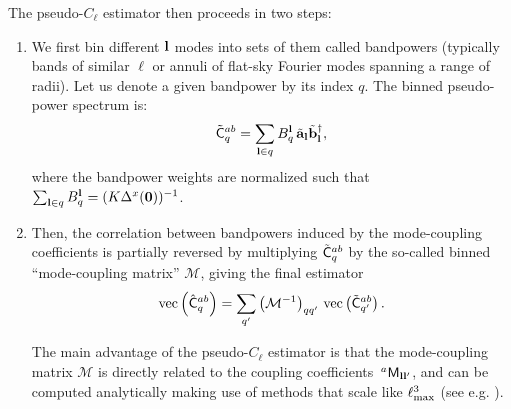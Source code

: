 \documentclass[a4paper,11pt]{article}
\begin{document}
      The pseudo-$C_\ell$ estimator then proceeds in two steps:
      \begin{enumerate}
        \item We first bin different ${\bf l}$ modes into sets of them called bandpowers (typically bands of similar $\ell$ or annuli of flat-sky Fourier modes spanning a range of radii). Let us denote a given bandpower by its index $q$. The binned pseudo-power spectrum is:
        \begin{equation}\label{eq:bandpowers}
          \tilde{\sf C}^{ab}_q=\sum_{{\bf l}\in q} B_q^{\bf l}\,\tilde{\bf a}_{\bf l}\tilde{\bf b}^\dag_{\bf l},
        \end{equation}
        where the bandpower weights are normalized such that $\sum_{{\bf l}\in
          q}B_q^{\bf l}=(K\Delta^x({\bf 0}))^{-1}$.
        \item Then, the correlation between bandpowers induced by the mode-coupling coefficients is partially reversed by multiplying $\tilde{\sf C}^{ab}_q$ by the so-called binned ``mode-coupling matrix'' $\mathcal{M}$, giving the final estimator
        \begin{equation}
          {\rm vec}\left(\hat{\sf C}^{ab}_q\right) = \sum_{q'} \left(\mathcal{M}^{-1}\right)_{qq'}\,{\rm vec}\left(\tilde{\sf C}^{ab}_{q'}\right).
        \end{equation}

        The main advantage of the pseudo-$C_\ell$ estimator is that the mode-coupling matrix $\mathcal{M}$ is directly related to the coupling coefficients $\,^a{\sf M}_{{\bf l}{\bf l}'}$, and can be computed analytically making use of methods that scale like $\ell_{\rm max}^3$ (see e.g. \cite{2002ApJ...567....2H}).
      \end{enumerate}
    
\end{document}
